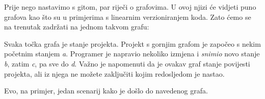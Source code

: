 Prije nego nastavimo s gitom, par riječi o grafovima. 
U ovoj njizi će vidjeti puno grafova kao što su u primjerima s linearnim verzioniranjem koda. 
Zato ćemo se na trenutak zadržati na jednom takvom grafu:



Svaka točka grafa je stanje projekta. 
Projekt s gornjim grafom je započeo s nekim početnim stanjem \emph a.
Programer je napravio nekoliko izmjena i \emph{snimio} novo stanje \emph b, zatim \emph c, pa sve do \emph d.
Važno je napomenuti da je ovakav graf stanje povijesti projekta, ali iz njega ne možete zaključiti kojim redosljedom je nastao.

Evo, na primjer, jedan scenarij kako je došlo do navedenog grafa.

